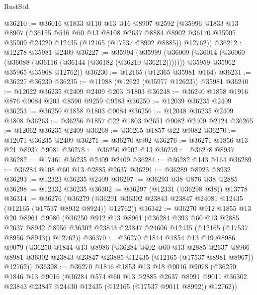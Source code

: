 \begin{lexlean}{RustStd}
\begin{coremodule}
@36210 := @36016
    @1833
    @110
    @13
    @16
    @8907
    @2592
    (@35996
      @1833
      @13
      @8907
      (@36155
        @516
        @60
        @13
        @8108
        @2637
        @8884
        @8902
        @36170
        @35905
        @35909
        @24220
        @12435
        (@12165 (@17537 @8902 @8885))
        @12762))
@36212 := @12278 @35981 @2409
@36227 := @35994
    (@35999
      (@36009
        (@36014 (@36060 (@36088 (@36116 (@36144 (@36182 (@36210 @36212)))))))
        @35959
        @35962
        @35965
        @35968
        @12762))
@36230 := @12165 (@12365 @35981 @164)
@36231 := @36227 @36230
@36235 := @11988 (@12622 (@35977 @12623)) @35981
@36240 := @12022 @36235 @2409 @2409 @203 @1803
@36248 := @36240 @1858 @1916 @876 @9084 @203 @8590 @9259 @9583
@36250 := @12039 @36235 @2409
@36253 := @36250 @1858 @1803 @9084
@36256 := @12048 @36235 @2409 @1808
@36263 := @36256 @1857 @22 @1803 @2651 @9082 @2409 @2124
@36265 := @12062 @36235 @2409
@36268 := @36265 @1857 @22 @9082
@36270 := @12071 @36235 @2409
@36271 := @36270 @902
@36276 := @36271 @1856 @13 @21 @8937 @9081
@36278 := @36250 @902 @13
@36279 := @36278 @8937
@36282 := @17461 @36235 @2409 @2409
@36284 := @36282 @143 @164
@36289 := @36284 @108 @60 @13 @2885 @2637
@36291 := @36289 @8923 @8932
@36293 := @12323 @36235 @2409
@36297 := @36293 @38 @876 @38 @2885
@36298 := @12332 @36235
@36302 := @36297 (@12331 (@36298 @38)) @13778
@36314 := @36276
    (@36279 (@36291 @36302 @23843 @23847 @24081 @12435 (@12165 (@17537 @8932 @8924)) @12762))
@36342 := @36270
    @912
    @1855
    @13
    @20
    @8961
    @9080
    (@36250
      @912
      @13
      @8961
      (@36284
        @393
        @60
        @13
        @2885
        @2637
        @8942
        @8956
        @36302
        @23843
        @23847
        @24606
        @12435
        (@12165 (@17537 @8956 @8943))
        @12762))
@36370 := @36270
    @1844
    @1854
    @13
    @19
    @8986
    @9079
    (@36250
      @1844
      @13
      @8986
      (@36284
        @402
        @60
        @13
        @2885
        @2637
        @8966
        @8981
        @36302
        @23843
        @23847
        @23885
        @12435
        (@12165 (@17537 @8981 @8967))
        @12762))
@36398 := @36270
    @1846
    @1853
    @13
    @18
    @9016
    @9078
    (@36250
      @1846
      @13
      @9016
      (@36284
        @574
        @60
        @13
        @2885
        @2637
        @8991
        @9011
        @36302
        @23843
        @23847
        @24430
        @12435
        (@12165 (@17537 @9011 @8992))
        @12762))

\end{coremodule}
\end{lexlean}
